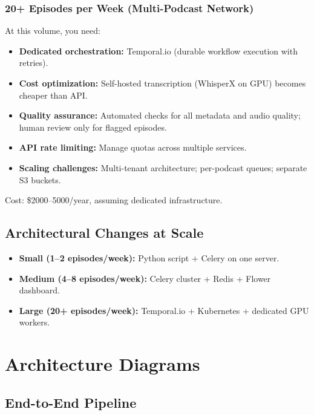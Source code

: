 \documentclass[11pt,letterpaper]{article}
\begin{document}
\subsubsection{20+ Episodes per Week (Multi-Podcast Network)}

At this volume, you need:

\begin{itemize}
  \item \textbf{Dedicated orchestration:} Temporal.io (durable workflow execution with retries).
  \item \textbf{Cost optimization:} Self-hosted transcription (WhisperX on GPU) becomes cheaper than API.
  \item \textbf{Quality assurance:} Automated checks for all metadata and audio quality; human review only for flagged episodes.
  \item \textbf{API rate limiting:} Manage quotas across multiple services.
  \item \textbf{Scaling challenges:} Multi-tenant architecture; per-podcast queues; separate S3 buckets.
\end{itemize}

Cost: \$2000–5000/year, assuming dedicated infrastructure.

\subsection{Architectural Changes at Scale}

\begin{itemize}
  \item \textbf{Small (1–2 episodes/week):} Python script + Celery on one server.
  \item \textbf{Medium (4–8 episodes/week):} Celery cluster + Redis + Flower dashboard.
  \item \textbf{Large (20+ episodes/week):} Temporal.io + Kubernetes + dedicated GPU workers.
\end{itemize}

\vspace{12pt}

\section{Architecture Diagrams}

\subsection{End-to-End Pipeline}
\end{document}
